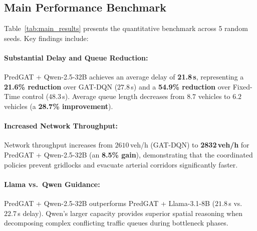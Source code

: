 \documentclass[11pt,a4paper,twocolumn]{article}
\begin{document}
\subsection{Main Performance Benchmark}
Table~\ref{tab:main_results} presents the quantitative benchmark across 5 random seeds. Key findings include:

\paragraph{Substantial Delay and Queue Reduction:} PredGAT + Qwen-2.5-32B achieves an average delay of \textbf{21.8\,s}, representing a \textbf{21.6\% reduction} over GAT-DQN ($27.8$\,s) and a \textbf{54.9\% reduction} over Fixed-Time control ($48.3$\,s). Average queue length decreases from $8.7$ vehicles to $6.2$ vehicles (a \textbf{28.7\% improvement}).

\paragraph{Increased Network Throughput:} Network throughput increases from $2610$\,veh/h (GAT-DQN) to \textbf{2832\,veh/h} for PredGAT + Qwen-2.5-32B (an \textbf{8.5\% gain}), demonstrating that the coordinated policies prevent gridlocks and evacuate arterial corridors significantly faster.

\paragraph{Llama vs.\ Qwen Guidance:} PredGAT + Qwen-2.5-32B outperforms PredGAT + Llama-3.1-8B ($21.8$\,s vs.\ $22.7$\,s delay). Qwen's larger capacity provides superior spatial reasoning when decomposing complex conflicting traffic queues during bottleneck phases.
\end{document}
